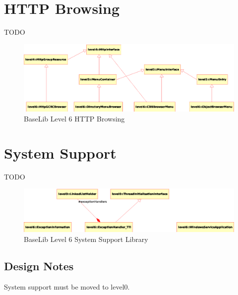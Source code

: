 \section{HTTP Browsing}

TODO

\begin{figure}[h!]
 \begin{center}
  \includegraphics[width=\textwidth]{level6/level6-Browser.eps}
  \caption{BaseLib Level 6 HTTP Browsing}
  \label{f:level6:HTTPbrowser}
 \end{center}
\end{figure}



\section{System Support}

TODO

\begin{figure}[h!]
 \begin{center}
  \includegraphics[width=\textwidth]{level6/level6-system.eps}
  \caption{BaseLib Level 6 System Support Library}
  \label{f:level6:system}
 \end{center}
\end{figure}



\subsection{Design Notes}
System support must be moved to level0.
